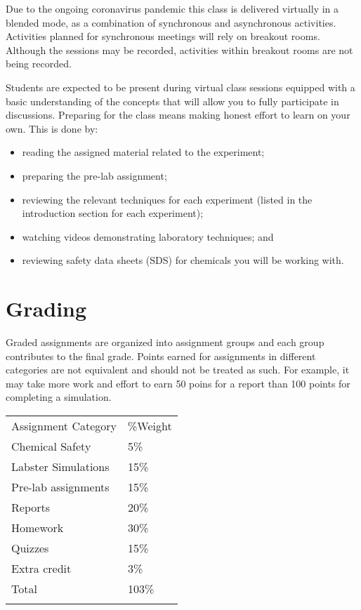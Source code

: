Due to the ongoing coronavirus pandemic this class is delivered
virtually in a blended mode, as a combination of synchronous and
asynchronous activities. Activities planned for synchronous meetings
will rely on breakout rooms. Although the sessions may be recorded,
activities within breakout rooms are not being recorded.

Students are expected to be present during virtual class sessions
equipped with a basic understanding of the concepts that will allow you
to fully participate in discussions. Preparing for the class means
making honest effort to learn on your own. This is done by:

\begin{itemize}
\tightlist
\item
  reading the assigned material related to the experiment;
\item
  preparing the pre-lab assignment;
\item
  reviewing the relevant techniques for each experiment (listed in the
  introduction section for each experiment);
\item
  watching videos demonstrating laboratory techniques; and
\item
  reviewing safety data sheets (SDS) for chemicals you will be working
  with.
\end{itemize}

\hypertarget{grading}{%
\section{Grading}\label{grading}}

Graded assignments are organized into assignment groups and each group
contributes to the final grade. Points earned for assignments in
different categories are not equivalent and should not be treated as
such. For example, it may take more work and effort to earn 50 poins for
a report than 100 points for completing a simulation.

\begin{longtable}[]{@{}ll@{}}
\toprule
Assignment Category & \%Weight \\ \addlinespace
\midrule
\endhead
Chemical Safety & 5\% \\ \addlinespace
Labster Simulations & 15\% \\ \addlinespace
Pre-lab assignments & 15\% \\ \addlinespace
Reports & 20\% \\ \addlinespace
Homework & 30\% \\ \addlinespace
Quizzes & 15\% \\ \addlinespace
Extra credit & 3\% \\ \addlinespace
Total & 103\% \\ \addlinespace
\bottomrule
\end{longtable}

